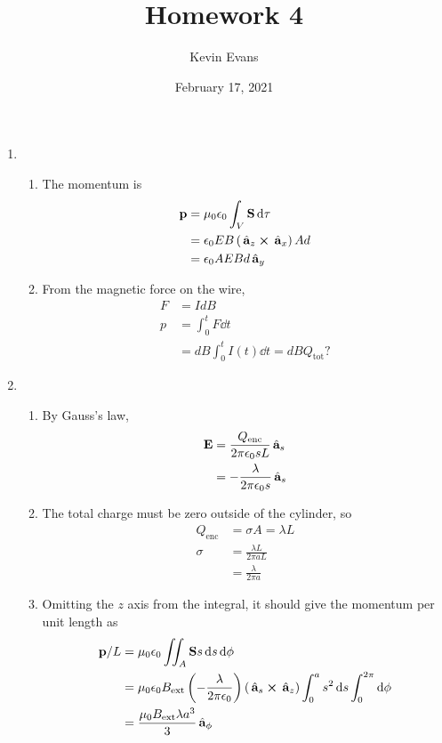 \documentclass{homework}
\title{Homework 4}
\author{Kevin Evans}
\date{February 17, 2021}
\begin{document}
	\maketitle
	\begin{enumerate}
		\item \begin{enumerate}
			\item The momentum is \begin{align*}
				\boldsymbol{\mathrm{p}} & = \mu_0 \epsilon_0 \int_V \boldsymbol{\mathrm{S}} \dd{\tau} \\
				& = \epsilon_0 EB \left(\thinspace\hat{ \mathbf{a}}_{z} \cross \thinspace\hat{ \mathbf{a}}_{x}\right) Ad \\
				& = \epsilon_0 A EB d \thinspace\hat{ \mathbf{a}}_{y}
			\end{align*}
			\item From the magnetic force on the wire, \begin{align*}
				F & = Id B \\
				p & = \int_0^t F \dd{t} \\
					& = dB \int_0^t I(t) \dd{t} = dB Q_\mathrm{tot}?
			\end{align*}
		\end{enumerate}
	
		\item \begin{enumerate}
			\item By Gauss's law, \begin{align*}
				\boldsymbol{\mathrm{ E }} & = \frac{ Q_\mathrm{enc} }{2 \pi \epsilon_0 s L} \thinspace\hat{ \mathbf{a}}_{s}\\
					& = -\frac{\lambda }{2 \pi \epsilon_0 s} \thinspace\hat{ \mathbf{a}}_{s}
			\end{align*}
		
			\item The total charge must be zero outside of the cylinder, so \begin{align*}
				Q_\mathrm{enc} & = \sigma A = \lambda L \\
				\sigma & = \frac{ \lambda L }{2 \pi a L} \\
					& = \frac{\lambda }{2 \pi a} 
			\end{align*}
		
			\item Omitting the $z$ axis from the integral, it should give the momentum per unit length as \begin{align*}
				\boldsymbol{\mathrm{p}} / L & = \mu_0 \epsilon_0 \iint_A \boldsymbol{\mathrm{S}} s \dd{s} \dd{\phi} \\
					& = \mu_0 \epsilon_0 B_\mathrm{ext} \left(-\frac{\lambda}{2 \pi \epsilon_0}\right) \left(\thinspace\hat{ \mathbf{a}}_{s} \cross \thinspace\hat{ \mathbf{a}}_{z}\right) \int_0^a s^2 \dd{s} \int_0^{2\pi} \dd{\phi} \\
					& = \frac{\mu_0 B_\mathrm{ext} \lambda a^3}{3} \thinspace\hat{ \mathbf{a}}_{\phi}
			\end{align*}
		\end{enumerate}
	

\end{enumerate}
\end{document}
